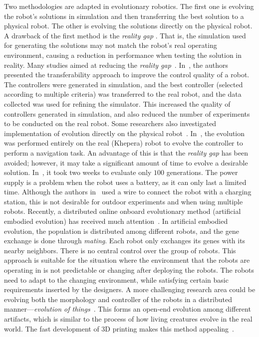 Two methodologies are adapted in evolutionary robotics. The first one is evolving the robot's solutions in simulation and then transferring the best solution to a physical robot. The other is evolving the solutions directly on the physical robot. A drawback of the first method is the \textit{reality gap} \cite{Jakobi95}. That is, the simulation used for generating the solutions may not match the robot's real operating environment, causing a reduction in performance when testing the solution in reality. Many studies aimed at reducing the \textit{reality gap}~\cite{Koos:TEVC:2013, Koos:IJRR:2013, Alan:2014}. In~\cite{Koos:TEVC:2013, Koos:IJRR:2013}, the authors presented the transferability approach to improve the control quality of a robot. The controllers were generated in simulation, and the best controller (selected according to multiple criteria) was transferred to the real robot, and the data collected was used for refining the simulator. This increased the quality of controllers generated in simulation, and also reduced the number of experiments to be conducted on the real robot. Some researchers also investigated implementation of evolution directly on the physical robot~\cite{Floreano1996, hornby1999autonomous, Zykov2004}. In~\cite{Floreano1996}, the evolution was performed entirely on the real (Khepera) robot to evolve the controller to perform a navigation task. An advantage of this is that the \textit{reality gap} has been avoided; however, it may take a significant amount of time to evolve a desirable solution. In~\cite{Floreano1996}, it took two weeks to evaluate only $100$ generations. The power supply is a problem when the robot uses a battery, as it can only last a limited time. Although the authors in~\cite{Floreano1996} used a wire to connect the robot with a charging station, this is not desirable for outdoor experiments and when using multiple robots. Recently, a distributed online onboard evolutionary method (artificial embodied evolution) has received much attention~\cite{Watson2012, eiben:inria-00531455, Eiben:EI:2012, eiben2013triangle}. In artificial embodied evolution, the population is distributed among different robots, and the gene exchange is done through \textit{mating}. Each robot only exchanges its genes with its nearby neighbors. There is no central control over the group of robots. This approach is suitable for the situation where the environment that the robots are operating in is not predictable or changing after deploying the robots. The robots need to adapt to the changing environment, while satisfying certain basic requirements inserted by the designers. A more challenging research area could be evolving both the morphology and controller of the robots in a distributed manner---\textit{evolution of things}~\cite{Eiben:2014:PPSN, Eiben:Nature:2015}. This forms an open-end evolution among different artifacts, which is similar to the process of how living creatures evolve in the real world. The fast development of 3D printing makes this method appealing~\cite{Tumbleston20032015}. 

